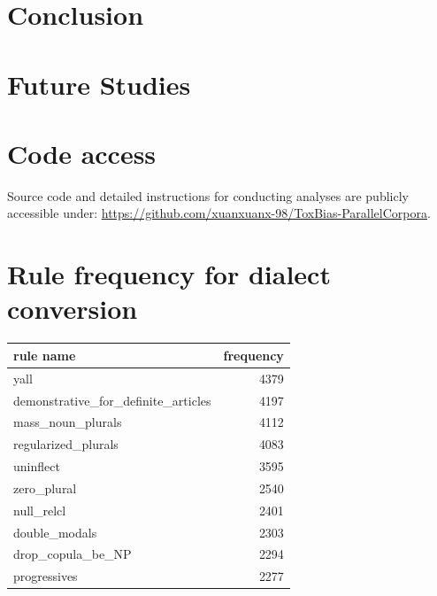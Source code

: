 \documentclass[11pt]{article}
\begin{document}
\newpage





\section{Conclusion}

\section{Future Studies}







\appendix

\section{Code access}

Source code and detailed instructions for conducting analyses are publicly accessible under: \href{https://github.com/xuanxuanx-98/ToxBias-ParallelCorpora}{https://github.com/xuanxuanx-98/ToxBias-ParallelCorpora}.

\section{Rule frequency for dialect conversion} \label{rules}

\begin{center}
\begin{tabular}{lr}
\hline
\textbf{rule name}                     & \textbf{frequency} \\ \hline
yall                                   & 4379               \\
demonstrative\_for\_definite\_articles & 4197               \\
mass\_noun\_plurals                    & 4112               \\
regularized\_plurals                   & 4083               \\
uninflect                              & 3595               \\
zero\_plural                           & 2540               \\
null\_relcl                            & 2401               \\
double\_modals                         & 2303               \\
drop\_copula\_be\_NP                   & 2294               \\
progressives                           & 2277               \\ \hline
\end{tabular}
\end{center}
\end{document}
